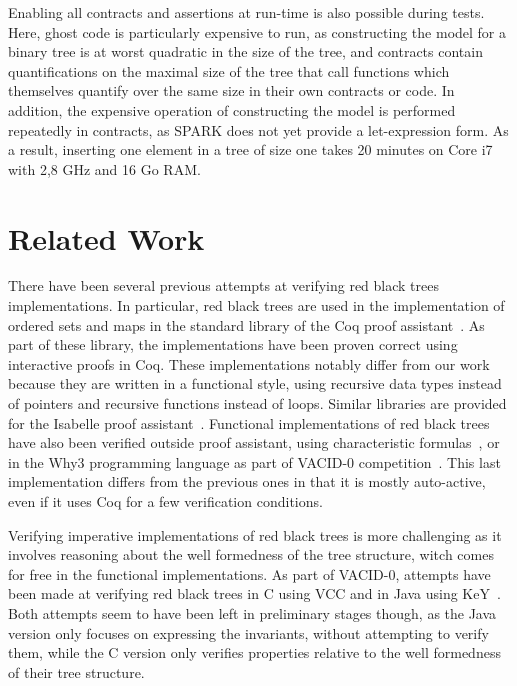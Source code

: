 \documentclass{llncs}
\begin{document}
Enabling all contracts and assertions at run-time is also possible during
tests. Here, ghost code is particularly expensive to run, as constructing the
model for a binary tree is at worst quadratic in the size of the tree, and
contracts contain quantifications on the maximal size of the tree that call
functions which themselves quantify over the same size in their own contracts
or code. In addition, the expensive operation of constructing the model is
performed repeatedly in contracts, as SPARK does not yet provide a
let-expression form.  As a result, inserting one element in a tree of size one
takes 20 minutes on Core i7 with 2,8 GHz and 16 Go RAM.

\section{Related Work}
\label{related-work}
There have been several previous attempts at verifying red black trees implementations. In particular, red black trees are
used in the implementation of ordered sets and maps in the standard library of the Coq proof
assistant~\cite{filliatre2004functors,appel2011efficient}. As part of these library, the implementations have been proven
correct using interactive proofs in Coq. These implementations notably differ from our work because they are written in
a functional style, using recursive data types instead of pointers and recursive functions instead of loops. Similar
libraries are provided for the Isabelle proof assistant~\cite{lammich2010isabelle}. Functional implementations of
red black trees have also been verified outside proof assistant, using characteristic formulas~\cite{chargueraud2010program},
or in the Why3 programming language as part of VACID-0 competition~\cite{leino2010vacid}. This last implementation differs from
the previous ones in that it is mostly auto-active, even if it uses Coq for a few verification conditions.

Verifying imperative implementations of red black trees is more challenging as it involves reasoning about the well formedness
of the tree structure, witch comes for free in the functional implementations. As part of VACID-0, attempts have been made at
verifying red black trees in C using VCC and in Java using KeY~\cite{bruns2011specification}.
Both attempts seem to have been left in preliminary stages
though, as the Java version only focuses on expressing the invariants, without attempting to verify them, while the C
version only verifies properties relative to the well formedness of their tree structure.
\end{document}

